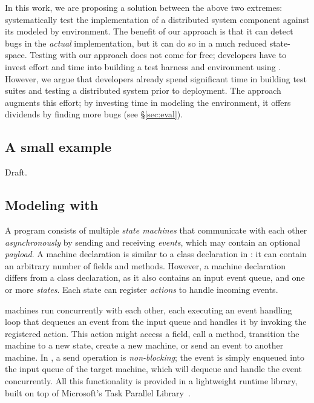In this work, we are proposing a solution between the above two extremes: systematically test the implementation of a distributed system component against its modeled by \psharp environment. The benefit of our approach is that it can detect bugs in the \emph{actual} implementation, but it can do so in a much reduced state-space. Testing with our approach does not come for free; developers have to invest effort and time into building a test harness and environment using \psharp. However, we argue that developers already spend significant time in building test suites and testing a distributed system prior to deployment. The \psharp approach augments this effort; by investing time in modeling the environment, it offers dividends by finding more bugs (see \S\ref{sec:eval}).

\subsection{A small example}
\label{sec:overview:example}

Draft.

\subsection{Modeling with \psharp}
\label{sec:overview:psharp}

A \psharp program consists of multiple \emph{state machines} that communicate with each other \emph{asynchronously} by sending and receiving \emph{events}, which may contain an optional \emph{payload}. A \psharp machine declaration is similar to a class declaration in \csharp: it can contain an arbitrary number of fields and methods. However, a machine declaration differs from a class declaration, as it also contains an input event queue, and one or more \emph{states}. Each state can register \emph{actions} to handle incoming events.

\psharp machines run concurrently with each other, each executing an event handling loop that dequeues an event from the input queue and handles it by invoking the registered action. This action might access a field, call a method, transition the machine to a new state, create a new machine, or send an event to another machine. In \psharp, a send operation is \emph{non-blocking}; the event is simply enqueued into the input queue of the target machine, which will dequeue and handle the event concurrently. All this functionality is provided in a lightweight runtime library, built on top of Microsoft's Task Parallel Library~\cite{leijen2009tpl}.

